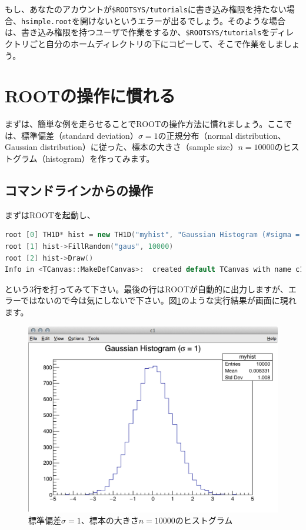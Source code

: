 {もし、あなたのアカウントが\texttt{\$ROOTSYS/tutorials}に書き込み権限を持たない場合、\texttt{hsimple.root}を開けないというエラーが出るでしょう。そのような場合は、書き込み権限を持つユーザで作業をするか、\texttt{\$ROOTSYS/tutorials}をディレクトリごと自分のホームディレクトリの下にコピーして、そこで作業をしましょう。

\section{ROOTの操作に慣れる}

まずは、簡単な例を走らせることでROOTの操作方法に慣れましょう。ここでは、標準偏差（standard deviation）$\sigma=1$の正規分布（normal distribution、Gaussian distribution）に従った、標本の大きさ（sample size）$n=10000$のヒストグラム（histogram）を作ってみます。

\subsection{コマンドラインからの操作}
まずはROOTを起動し、
\begin{lstlisting}[language=c++]
root [0] TH1D* hist = new TH1D("myhist", "Gaussian Histogram (#sigma = 1)", 50, -5, 5)
root [1] hist->FillRandom("gaus", 10000)
root [2] hist->Draw()
Info in <TCanvas::MakeDefCanvas>:  created default TCanvas with name c1
\end{lstlisting}
という3行を打ってみて下さい。最後の行はROOTが自動的に出力しますが、エラーではないので今は気にしないで下さい。図\ref{fig:first_script}のような実行結果が画面に現れます。
\begin{figure}
  \centering
  \includegraphics[width=12cm]{fig/first_script.png}
  \caption{標準偏差$\sigma=1$、標本の大きさ$n=10000$のヒストグラム}
  \label{fig:first_script}
\end{figure}

}
